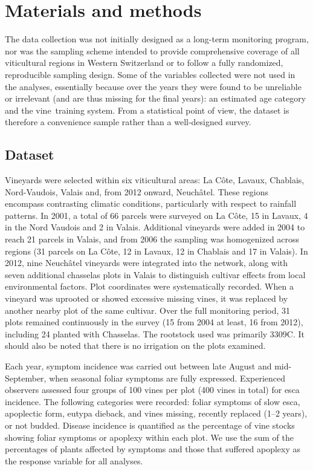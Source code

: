 \section{Materials and methods}\label{sec:methods}

The data collection was not initially designed as a long-term monitoring program, nor was the sampling scheme intended to provide comprehensive coverage of all viticultural regions in Western Switzerland or to follow a fully randomized, reproducible sampling design. Some of the variables collected were not used in the analyses, essentially because over the years they were found to be unreliable or irrelevant (and are thus missing for the final years): an estimated age category and the vine~training system. From a statistical point of view, the dataset is therefore a convenience sample rather than a well-designed survey.

\subsection{Dataset}

Vineyards were selected within six viticultural areas: La Côte, Lavaux, Chablais, Nord-Vaudois, Valais and, from 2012 onward, Neuchâtel. These regions encompass contrasting climatic conditions, particularly with respect to rainfall patterns. In 2001, a total of 66 parcels were surveyed on La Côte, 15 in Lavaux, 4 in the Nord Vaudois and 2 in Valais. Additional vineyards were added in 2004 to reach 21 parcels in Valais, and from 2006 the sampling was homogenized across regions (31 parcels on La Côte, 12 in Lavaux, 12 in Chablais and 17 in Valais). In 2012, nine Neuchâtel vineyards were integrated into the network, along with seven additional chasselas plots in Valais to distinguish cultivar effects from local environmental factors. Plot coordinates were systematically recorded. When a vineyard was uprooted or showed excessive missing vines, it was replaced by another nearby plot of the same cultivar. Over the full monitoring period, 31 plots remained continuously in the survey (15 from 2004 at least, 16 from 2012), including 24 planted with Chasselas. The rootstock used was primarily 3309C. It should also be noted that there is no irrigation on the plots examined.

Each year, symptom incidence was carried out between late August and mid-September, when seasonal foliar symptoms are fully expressed. Experienced observers assessed four groups of 100 vines per plot (400 vines in total) for esca incidence. The following categories were recorded: foliar symptoms of slow esca, apoplectic form, eutypa dieback, and vines missing, recently replaced (1--2 years), or not budded. Disease incidence is quantified as the percentage of vine stocks showing foliar symptoms or apoplexy within each plot. We use the sum of the percentages of plants affected by symptoms and those that suffered apoplexy as the response variable for all analyses.

